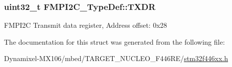 \subsubsection[{\texorpdfstring{T\+X\+DR}{TXDR}}]{ uint32\+\_\+t F\+M\+P\+I2\+C\+\_\+\+Type\+Def\+::\+T\+X\+DR}\hypertarget{struct_f_m_p_i2_c___type_def_a9d79189764dcb9a54fed33b6b1b5a256}{}\label{struct_f_m_p_i2_c___type_def_a9d79189764dcb9a54fed33b6b1b5a256}
F\+M\+P\+I2C Transmit data register, Address offset\+: 0x28 

The documentation for this struct was generated from the following file\+:\begin{DoxyCompactItemize}
\item 
Dynamixel-\/\+M\+X106/mbed/\+T\+A\+R\+G\+E\+T\+\_\+\+N\+U\+C\+L\+E\+O\+\_\+\+F446\+R\+E/\hyperlink{stm32f446xx_8h}{stm32f446xx.\+h}\end{DoxyCompactItemize}

